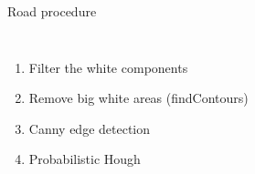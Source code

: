 \documentclass[12pt]{beamer}
\begin{document}
\begin{frame}{Road procedure}
    \begin{columns}
    \begin{enumerate}
        \item<1-> Filter the white components
        \item<2-> Remove big white areas (findContours)
        \item<3-> Canny edge detection
        \item<4-> Probabilistic Hough
    \end{enumerate}
\end{columns}
\end{frame}
\end{document}
